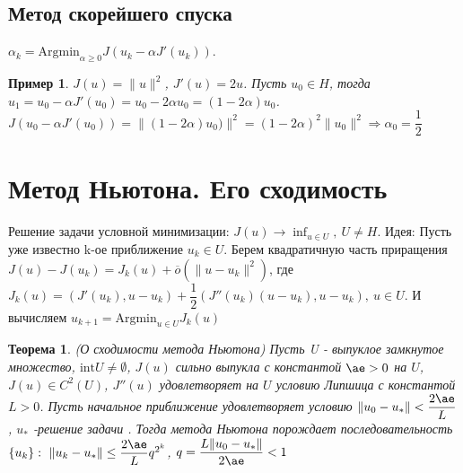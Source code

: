 \documentclass[9pt, a4paper]{extarticle}
\newtheorem*{theorem}{Теорема}
\newtheorem*{sample}{Пример}
\begin{document}
	\subsection*{Метод скорейшего спуска}
	$\alpha_k = \text{Argmin}_{\alpha \geq 0} J(u_k - \alpha J'(u_k))$. 
	\begin{sample}
		$J(u) = \|u\|^2$, $J'(u) = 2 u$. Пусть $u_0 \in H$, тогда $ u_1 = u_0 - \alpha J'(u_0) = u_0 - 2 \alpha u_0 = (1- 2\alpha) u_0$. $J(u_0 - \alpha J'(u_0)) = \|(1- 2\alpha )u_0)\|^2 = (1-2\alpha)^2 \|u_0\|^2 \Rightarrow \alpha_0 = \dfrac12$
	\end{sample}
\section{Метод Ньютона. Его сходимость}
	Решение задачи условной минимизации: $J(u) \to \inf_{u\in U}, \ U \neq H$. \newline
	Идея: Пусть уже известно k-ое приближение $u_k \in U$. Берем квадратичную часть приращения $J(u) - J(u_k) = J_k(u) + \overline{o}(\|u- u_k\|^2)$, где $J_k(u) = (J'(u_k), u - u_k) + \dfrac12 (J''(u_k)(u-u_k), u-u_k), \ u\in U$. И вычисляем $u_{k+1} = \text{Argmin}_{u\in U} J_k(u)$
	
	\begin{theorem}
		(О сходимости метода Ньютона)\newline
		Пусть U - выпуклое замкнутое множество, $\text{int} U \neq \emptyset$, $J(u)$ сильно выпукла с константой $\ae >0$ на $U$, $J(u) \in C^2(U)$, $J''(u)$ удовлетворяет на $U$ условию Липшица с константой $L> 0$. Пусть начальное приближение удовлетворяет условию $\|u_0 - u_*\| < \dfrac{2\ae}{L}$, $u_*$ -решение задачи . Тогда метода Ньютона порождает последовательность $\{u_k\}:\ \|u_k - u_*\| \leq \dfrac{2\ae}{L}q^{2^k}$, $q = \dfrac{L \|u_0 -u_*\|}{2\ae} < 1$
	\end{theorem}
\end{document}
